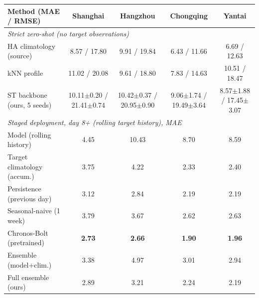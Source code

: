 \begin{tabular}{lcccc}
\toprule
Method (MAE / RMSE) & Shanghai & Hangzhou & Chongqing & Yantai \\
\midrule
\multicolumn{5}{l}{\emph{Strict zero-shot (no target observations)}} \\
HA climatology (source) & 8.57 / 17.80 & 9.91 / 19.84 & 6.43 / 11.66 & 6.69 / 12.63 \\
kNN profile & 11.02 / 20.08 & 9.61 / 18.80 & 7.83 / 14.63 & 10.51 / 18.47 \\
ST backbone (ours, 5 seeds) & 10.11$\pm$0.20 / 21.41$\pm$0.74 & 10.42$\pm$0.37 / 20.95$\pm$0.90 & 9.06$\pm$1.74 / 19.49$\pm$3.64 & 8.57$\pm$1.88 / 17.45$\pm$3.07 \\
\midrule
\multicolumn{5}{l}{\emph{Staged deployment, day 8+ (rolling target history), MAE}} \\
Model (rolling history) & 4.45 & 10.43 & 8.70 & 8.59 \\
Target climatology (accum.) & 3.75 & 4.22 & 2.33 & 2.40 \\
Persistence (previous day) & 3.12 & 2.84 & 2.19 & 2.19 \\
Seasonal-naive (1 week) & 3.79 & 3.67 & 2.62 & 2.63 \\
Chronos-Bolt (pretrained) & \textbf{2.73} & \textbf{2.66} & \textbf{1.90} & \textbf{1.96} \\
Ensemble (model+clim.) & 3.38 & 4.97 & 3.01 & 2.94 \\
Full ensemble (ours) & 2.89 & 3.21 & 2.24 & 2.19 \\
\bottomrule
\end{tabular}
